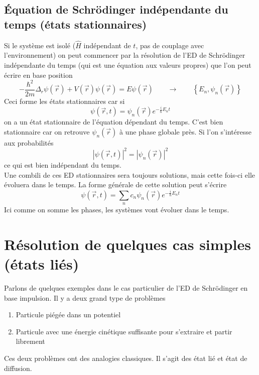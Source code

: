 	\subsection{Équation de Schrödinger indépendante du temps (états stationnaires)}
	Si le système est isolé ($\hat H$ indépendant de $t$, pas de couplage avec l'environnement) on peut commencer 
	par la résolution de l'ED de Schrödinger indépendante du temps (qui est une équation aux valeurs propres)
	 que l'on peut écrire en base position
	\begin{equation}
	-\frac{\hbar^2}{2m}\Delta_r\psi(\vec{r}) + V(\vec{r})\psi(\vec{r}) = E\psi(\vec{r})\qquad\longrightarrow
	\qquad \left\{E_n,\psi_n(\vec{r})\right\}
	\end{equation}
	Ceci forme les états stationnaires car si
	\begin{equation}
	\psi(\vec{r},t) = \psi_n(\vec{r})e^{-\frac{i}{\hbar}E_nt}
	\end{equation}
	on a un état stationnaire de l'équation dépendant du temps. C'est bien stationnaire car on retrouve 
	$\psi_n(\vec{r})$ à une phase globale près. Si l'on s'intéresse aux probabilités
	\begin{equation}
	|\psi(\vec{r},t)|^2 = |\psi_n(\vec{r})|^2
	\end{equation}
	ce qui est bien indépendant du temps. \\
	
	Une combili de ces ED stationnaires sera toujours solutions, mais cette fois-ci elle évoluera dans le 
	temps. La forme générale de cette solution peut s'écrire
	\begin{equation}
	\psi(\vec{r},t) = \sum_n c_n\psi_n(\vec{r})e^{-\frac{i}{\hbar}E_nt}
	\end{equation}
	Ici comme on somme les phases, les systèmes vont évoluer dans le temps.
	
\section{Résolution de quelques cas simples (états liés)}
Parlons de quelques exemples dans le cas particulier de l'ED de Schrödinger en base impulsion. Il y a 
deux grand type de problèmes
\begin{enumerate}
\item Particule piégée dans un potentiel %
\item Particule avec une énergie cinétique suffisante pour s'extraire et partir librement
\end{enumerate}
Ces deux problèmes ont des analogies classiques. Il s'agit des état lié et état de diffusion.\\

